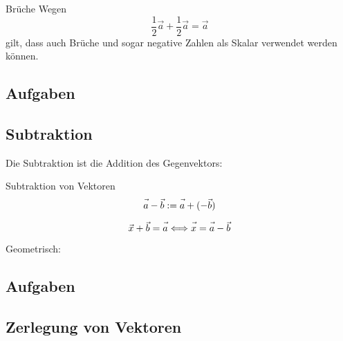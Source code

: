 \begin{beispiel}{Brüche}{}
  Wegen
  $$\frac12\vec{a} + \frac12\vec{a} = \vec{a}$$
  gilt, dass auch Brüche und sogar  negative Zahlen als Skalar
  verwendet werden können.
\end{beispiel}
\newpage

\subsection*{Aufgaben}
\newpage

\subsection{Subtraktion}

Die Subtraktion ist die Addition des Gegenvektors:

\begin{definition}{Subtraktion von Vektoren}{}
  $$\vec{a\vphantom{b}} - \vec{b} := \vec{a\vphantom{b}} + (-\vec{b})$$
\end{definition}

\begin{bemerkung}{}{}
  $$\vec{x\vphantom{x}} + \vec{b} = \vec{a\vphantom{b}} \Longleftrightarrow \vec{x\vphantom{b}} = \vec{a\vphantom{b}} - \vec{b}$$
\end{bemerkung}

Geometrisch:


\subsection*{Aufgaben}
\newpage


\subsection{Zerlegung von Vektoren}

